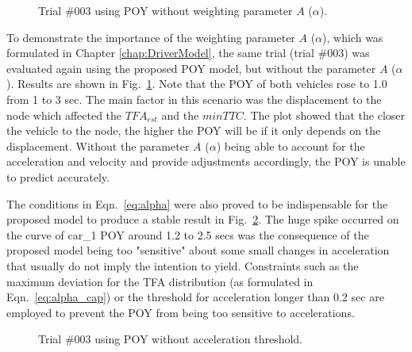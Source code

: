 \newpage


\begin{figure}[htbp!]
\begin{center}
\end{center}
\caption{Trial \#003 using POY without weighting parameter $A$ ($\alpha$).}
\label{fig:trial003WOalpha} 
\end{figure}



To demonstrate the importance of the weighting parameter $A$ ($\alpha$), which was formulated in Chapter \ref{chap:DriverModel}, the same trial (trial \#003) was evaluated again using the proposed POY model, but without the parameter $A$ ($\alpha$). Results are shown in Fig.~\ref{fig:trial003WOalpha}. Note that the POY of both vehicles rose to 1.0 from 1 to 3 sec. The main factor in this scenario was the displacement to the node which affected the $TFA_{est}$ and the $min TTC$. The plot showed that the closer the vehicle to the node, the higher the POY will be if it only depends on the displacement. Without the parameter $A$ ($\alpha$) being able to account for the acceleration and velocity and provide adjustments accordingly, the POY is unable to predict accurately. 

The conditions in Eqn.~\ref{eq:alpha} were also proved to be indispensable for the proposed model to produce a stable result in Fig.~\ref{fig:trial003WOcondition}. The huge spike occurred on the curve of car\_1 POY around 1.2 to 2.5 secs was the consequence of the proposed model being too "sensitive" about some small changes in acceleration that usually do not imply the intention to yield. Constraints such as the maximum deviation for the TFA distribution (as formulated in Eqn.~\ref{eq:alpha_cap}) or the threshold for acceleration longer than 0.2 sec are employed to prevent the POY from being too sensitive to accelerations.

\begin{figure}[htbp!]
\begin{center}
\end{center}
\caption{Trial \#003 using POY without acceleration threshold.}
\label{fig:trial003WOcondition} 
\end{figure}


